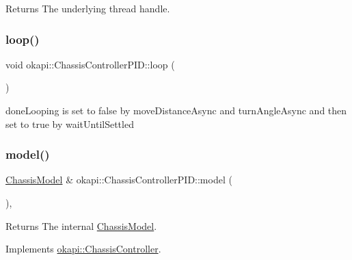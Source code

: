 \begin{DoxyReturn}{Returns}
The underlying thread handle. 
\end{DoxyReturn}
\mbox{\label{classokapi_1_1ChassisControllerPID_ab78f673aa582db34b374f0fb6398be9e}} 
\subsubsection{\texorpdfstring{loop()}{loop()}}
{\footnotesize\ttfamily void okapi\+::\+Chassis\+Controller\+P\+I\+D\+::loop (\begin{DoxyParamCaption}{ }\end{DoxyParamCaption})\hspace{0.3cm}{\ttfamily [protected]}}

done\+Looping is set to false by move\+Distance\+Async and turn\+Angle\+Async and then set to true by wait\+Until\+Settled\mbox{\label{classokapi_1_1ChassisControllerPID_a225446cae7b569ff104d41d9aa2ae9b8}} 
\subsubsection{\texorpdfstring{model()}{model()}}
{\footnotesize\ttfamily \mbox{\hyperlink{classokapi_1_1ChassisModel}{Chassis\+Model}} \& okapi\+::\+Chassis\+Controller\+P\+I\+D\+::model (\begin{DoxyParamCaption}{ }\end{DoxyParamCaption})\hspace{0.3cm}{\ttfamily [override]}, {\ttfamily [virtual]}}

\begin{DoxyReturn}{Returns}
The internal \mbox{\hyperlink{classokapi_1_1ChassisModel}{Chassis\+Model}}. 
\end{DoxyReturn}


Implements \mbox{\hyperlink{classokapi_1_1ChassisController_a239802eda7e4317a65d1a04994f7b97e}{okapi\+::\+Chassis\+Controller}}.

\mbox{\label{classokapi_1_1ChassisControllerPID_ab5f0409c6add9b1c3b176b61643de067}} 
